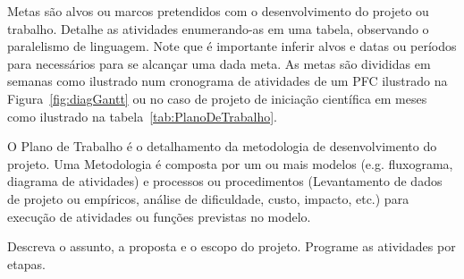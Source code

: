 Metas 	são alvos ou marcos pretendidos com o desenvolvimento do
projeto ou trabalho. Detalhe as atividades enumerando-as em uma tabela,
observando o paralelismo de linguagem. Note que é importante inferir
alvos e datas ou períodos para necessários para se alcançar uma dada
meta. As metas são  divididas em semanas como ilustrado num cronograma de atividades de um PFC ilustrado na Figura~\ref{fig:diagGantt} ou no caso de projeto de iniciação científica em meses como ilustrado na  tabela~\ref{tab:PlanoDeTrabalho}. 

O Plano de Trabalho é o detalhamento da metodologia de desenvolvimento
do projeto. Uma Metodologia é composta por um ou mais modelos (e.g.
fluxograma, diagrama de atividades) e processos ou procedimentos
(Levantamento de dados de projeto ou empíricos, análise de dificuldade,
custo, impacto, etc.) para execução de atividades ou funções previstas
no modelo.

Descreva o assunto, a proposta e o escopo do projeto. Programe as
atividades por etapas.

